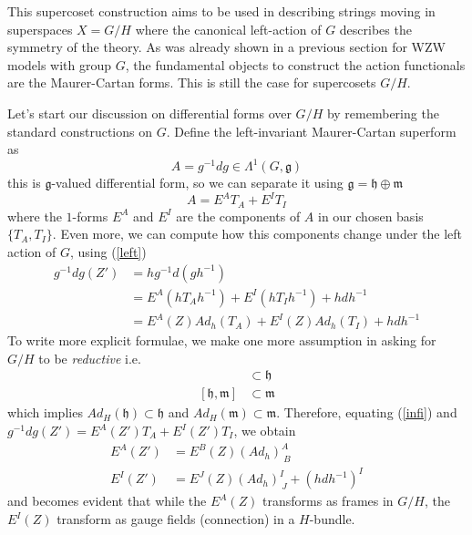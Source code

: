 \documentclass[a4paper,12pt]{article}
\numberwithin{equation}{section}
\numberwithin{thm}{section}
\numberwithin{exm}{section}
\newcommand{\p}{\partial}
\newcommand{\mo}{^{-1}}
\newcommand{\<}{{\langle}}
\renewcommand{\>}{{\rangle}}
\newcommand{\mf}{\mathfrak}
\renewcommand{\L}{{\Lambda}}
\begin{document}
This supercoset construction aims to be used in describing strings moving in superspaces $X = G/H$ where the canonical left-action of $G$ describes the symmetry of the theory. As was already shown in a previous section for WZW models with group $G$, the fundamental objects to construct the action functionals are the Maurer-Cartan forms. This is still the case for supercosets $G/H$.

Let's start our discussion on differential forms over $G/H$ by remembering the standard constructions on $G$. Define the left-invariant Maurer-Cartan superform as
	\begin{equation}
	A = g\mo d g \in \L^1(G, \mf g)
	\end{equation}
this is $\mf g$-valued differential form, so we can separate it using $\mf g = \mf h \oplus \mf m$
	\begin{equation}
	A = E^A T_A + E^I T_I
	\end{equation}
where the $1$-forms $E^A$ and $E^I$ are the components of $A$ in our chosen basis $\{T_A, T_I\}$. Even more, we can compute how this components change under the left action of $G$, using (\ref{left})
	\begin{align}
	g\mo d g(Z') & = h g\mo d (g h\mo) \nonumber \\
	& = E^A (h T_A h\mo) + E^I (h T_I h\mo) + h dh\mo \nonumber\\
	& = E^A(Z) Ad_{h}(T_A) + E^I(Z) Ad_{h} (T_I) + h dh\mo \label{infi}
	\end{align}
To write more explicit formulae, we make one more assumption in asking for $G/H$ to be {\it reductive} i.e.
	\begin{align}
	[\mf h, \mf h] & \subset \mf h \\
	[\mf h, \mf m] & \subset \mf m
	\end{align}
which implies $Ad_H(\mf h) \subset \mf h$ and $Ad_H(\mf m) \subset \mf m$. Therefore, equating (\ref{infi}) and $g\mo dg(Z') = E^A(Z') T_A + E^I(Z')T_I$, we obtain
	\begin{align}
	E^A(Z') & = E^B(Z) (Ad_h)^A_{\ B} \\
	E^I(Z') & = E^J(Z) (Ad_h)^I_{\ J} + (hdh\mo)^I
	\end{align}
and becomes evident that while the $E^A(Z)$ transforms as frames in $G/H$, the $E^I(Z)$ transform as gauge fields (connection) in a $H$-bundle.
\end{document}
